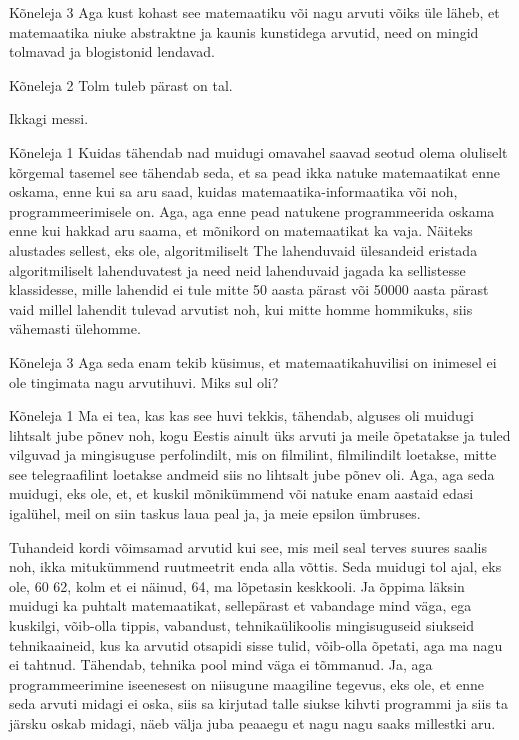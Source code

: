 Kõneleja 3
Aga kust kohast see matemaatiku või nagu arvuti võiks üle läheb, et matemaatika niuke abstraktne ja kaunis kunstidega arvutid, need on mingid tolmavad ja blogistonid lendavad. 

Kõneleja 2
Tolm tuleb pärast on tal. 

Ikkagi messi. 

Kõneleja 1
Kuidas tähendab nad muidugi omavahel saavad seotud olema oluliselt kõrgemal tasemel see tähendab seda, et sa pead ikka natuke matemaatikat enne oskama, enne kui sa aru saad, kuidas matemaatika-informaatika või noh, programmeerimisele on. Aga, aga enne pead natukene programmeerida oskama enne kui hakkad aru saama, et mõnikord on matemaatikat ka vaja. Näiteks alustades sellest, eks ole, algoritmiliselt The lahenduvaid ülesandeid eristada algoritmiliselt lahenduvatest ja need neid lahenduvaid jagada ka sellistesse klassidesse, mille lahendid ei tule mitte 50 aasta pärast või 50000 aasta pärast vaid millel lahendit tulevad arvutist noh, kui mitte homme hommikuks, siis vähemasti ülehomme. 

Kõneleja 3
Aga seda enam tekib küsimus, et matemaatikahuvilisi on inimesel ei ole tingimata nagu arvutihuvi. Miks sul oli? 

Kõneleja 1
Ma ei tea, kas kas see huvi tekkis, tähendab, alguses oli muidugi lihtsalt jube põnev noh, kogu Eestis ainult üks arvuti ja meile õpetatakse ja tuled vilguvad ja mingisuguse perfolindilt, mis on filmilint, filmilindilt loetakse, mitte see telegraafilint loetakse andmeid siis no lihtsalt jube põnev oli. Aga, aga seda muidugi, eks ole, et, et kuskil mõnikümmend või natuke enam aastaid edasi igalühel, meil on siin taskus laua peal ja, ja meie epsilon ümbruses. 

Tuhandeid kordi võimsamad arvutid kui see, mis meil seal terves suures saalis noh, ikka mitukümmend ruutmeetrit enda alla võttis. Seda muidugi tol ajal, eks ole, 60 62, kolm et ei näinud, 64, ma lõpetasin keskkooli. Ja õppima läksin muidugi ka puhtalt matemaatikat, sellepärast et vabandage mind väga, ega kuskilgi, võib-olla tippis, vabandust, tehnikaülikoolis mingisuguseid siukseid tehnikaaineid, kus ka arvutid otsapidi sisse tulid, võib-olla õpetati, aga ma nagu ei tahtnud. Tähendab, tehnika pool mind väga ei tõmmanud. Ja, aga programmeerimine iseenesest on niisugune maagiline tegevus, eks ole, et enne seda arvuti midagi ei oska, siis sa kirjutad talle siukse kihvti programmi ja siis ta järsku oskab midagi, näeb välja juba peaaegu et nagu nagu saaks millestki aru. 

